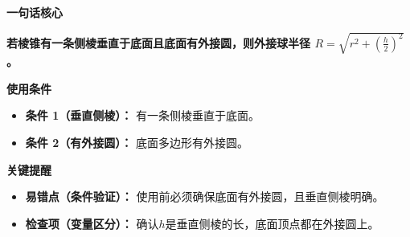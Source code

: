 \begin{summarybox}
	\textbf{\textcolor{CSummary}{一句话核心}}

	\textbf{若棱锥有一条侧棱垂直于底面且底面有外接圆，则外接球半径 $R = \sqrt{r^{2} + \left(\frac{h}{2}\right)^{2}}$。}

	\medskip
	\textbf{\textcolor{CSummary}{使用条件}}
	\begin{itemize}[leftmargin=*, itemsep=0.5em, topsep=0.4em]
		\item \textbf{条件 1（垂直侧棱）：} 有一条侧棱垂直于底面。
		\item \textbf{条件 2（有外接圆）：} 底面多边形有外接圆。
	\end{itemize}

	\medskip
	\textbf{\textcolor{CSummary}{关键提醒}}
	\begin{itemize}[leftmargin=*, itemsep=0.5em, topsep=0.4em]
		\item \textbf{易错点（条件验证）：} 使用前必须确保底面有外接圆，且垂直侧棱明确。
		\item \textbf{检查项（变量区分）：} 确认$h$是垂直侧棱的长，底面顶点都在外接圆上。
	\end{itemize}
\end{summarybox}
